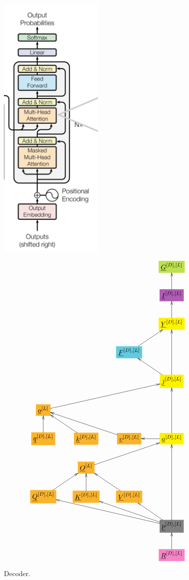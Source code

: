 \documentclass[12pt]{article}
\begin{document}
\begin{figure}[h!]\centering
\begin{minipage}{.5\linewidth}
\includegraphics[width=2in]{decoder.jpg}
\end{minipage}%
\begin{minipage}{.5\linewidth}
$$\xymatrix{
&&&*+[F*:SpringGreen]{\underline{G}^{[D], [L]}}
\\
&&&*+[F*:Orchid]{\underline{I}^{[D], [L]}}\ar[u]
\\
&&&*+[F*:yellow]{\underline{Y}^{[D], [L]}}\ar[u]
\\
&&*+[F*:SkyBlue]{\underline{F}^{[D], [L]}}\ar[ur]&
\\
&&&*+[F*:yellow]{\underline{j}^{[D], [L]}}\ar[uu]\ar[ul]
\\
*+[F*:Dandelion]{\underline{o}^{[L]}}\ar[urrr]&&&
\\
*+[F*:Dandelion]{\underline{q}^{[D], [L]}}\ar[u]&*+[F*:Dandelion]{\underline{k}^{[D], [L]}}\ar[ul]&*+[F*:Dandelion]{\underline{v}^{[D], [L]}}\ar[ull]&*+[F*:yellow]{\underline{a}^{[D], [L]}}\ar[uu]\ar[l]
\\
&*+[F*:Dandelion]{\underline{O}^{[L]}}\ar[urr]&&
\\
*+[F*:Dandelion]{\underline{Q}^{[D], [L]}}\ar[ur]&*+[F*:Dandelion]{\underline{K}^{[D], [L]}}\ar[u]&*+[F*:Dandelion]{\underline{V}^{[D], [L]}}\ar[ul]&
\\
&&&*+[F*:gray]{\underline{p}^{[D], [L]}}\ar[uuu]\ar[ulll]\ar[ull]\ar[ul]
\\
&&&*+[F*:Lavender]{\underline{R}^{[D], [L]}}\ar[u]
}$$
\end{minipage}
\caption{Decoder.}
\label{fig-texnn-for-decoder}
\end{figure}
\end{document}
